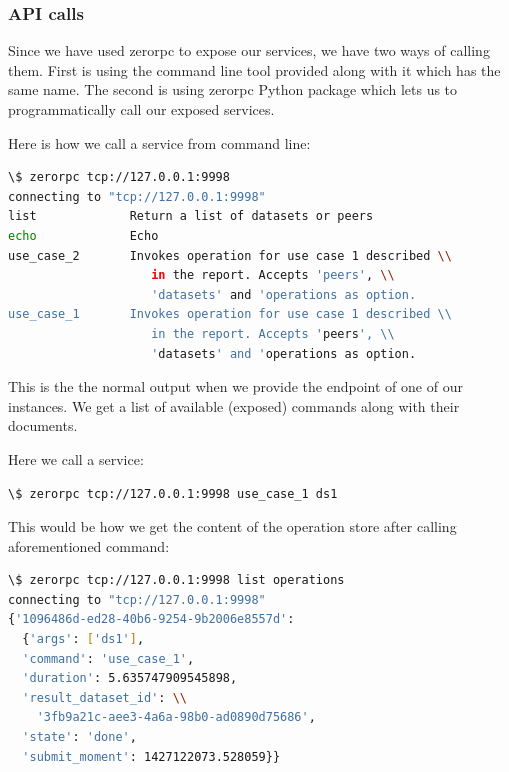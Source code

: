 \subsubsection{API calls}
Since we have used zerorpc to expose our services, we have two ways of calling them.
First is using the command line tool provided along with it which has the same name.
The second is using zerorpc Python package which lets us to programmatically call
our exposed services.

Here is how we call a service from command line:

\begin{lstlisting}[language=sh, caption={Quering an API endpoint for available commands}]
\$ zerorpc tcp://127.0.0.1:9998
connecting to "tcp://127.0.0.1:9998"
list             Return a list of datasets or peers
echo             Echo
use_case_2       Invokes operation for use case 1 described \\
					in the report. Accepts 'peers', \\
					'datasets' and 'operations as option.
use_case_1       Invokes operation for use case 1 described \\
					in the report. Accepts 'peers', \\
					'datasets' and 'operations as option.
\end{lstlisting}

This is the the normal output when we provide the endpoint of one of our instances. 
We get a list of available (exposed) commands along with their documents.

Here we call a service:
\begin{lstlisting}[language=sh, caption={Running an operation on a dataset}]
\$ zerorpc tcp://127.0.0.1:9998 use_case_1 ds1
\end{lstlisting}

This would be how we get the content of the operation store after calling aforementioned command:

\begin{lstlisting}[language=sh, caption={Getting list of operations}]
\$ zerorpc tcp://127.0.0.1:9998 list operations
connecting to "tcp://127.0.0.1:9998"
{'1096486d-ed28-40b6-9254-9b2006e8557d': 
  {'args': ['ds1'],
  'command': 'use_case_1',
  'duration': 5.635747909545898,
  'result_dataset_id': \\
  	'3fb9a21c-aee3-4a6a-98b0-ad0890d75686',
  'state': 'done',
  'submit_moment': 1427122073.528059}}
\end{lstlisting}

